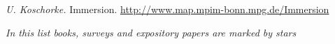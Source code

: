 \documentclass[12pt]{article}
\newcommand{\jonly}[1]{}
\newcommand{\aronly}[1]{#1}
\theoremstyle{plain}
\theoremstyle{definition}
\begin{document}
\begin{thebibliography}{99}



\aksoe
\amsw


\crsot
\aronly{\crsk}

\fvto

\gres

\hast
\haef
\hifn
\hkne


\aronly{\kmsth}
\koee

 \emph{U. Koschorke.} Immersion. \url{http://www.map.mpim-bonn.mpg.de/Immersion}

\meos
\meoe
\miso
\mwof
\mwos
\aronly{\mwosd}

\przs

\aronly{\rssec}
\rsst

\skzz
\skzt
\skze
\skos
\jonly{\skose}
\aronly{\sk}
\sktzd
\skon

\wess

\end{thebibliography}

{\it In this list books, surveys and expository papers are marked by stars}
\end{document}
